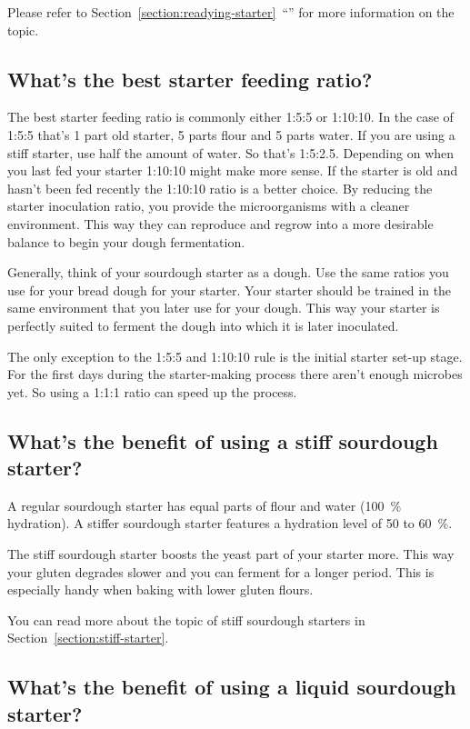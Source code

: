 Please refer to
Section~\ref{section:readying-starter}~``''
for more information on the topic.



\subsection{What's the best starter feeding ratio?}

The best starter feeding ratio is commonly either 1:5:5 or 1:10:10.
In the case of 1:5:5 that's 1 part old starter,
5 parts flour and 5 parts water. If you are using a stiff starter,
use half the amount of water. So that's 1:5:2.5. Depending on when
you last fed your starter 1:10:10 might make more sense. If the starter
is old and hasn't been fed recently the 1:10:10 ratio is a better choice.
By reducing the starter inoculation ratio, you provide the microorganisms
with a cleaner environment. This way they can reproduce and regrow
into a more desirable balance to begin your dough fermentation.

Generally, think of your sourdough starter as a dough. Use the same
ratios you use for your bread dough for your starter. Your starter
should be trained in the same environment that you later use
for your dough. This way your starter is perfectly suited to
ferment the dough into which it is later inoculated.

The only exception to the 1:5:5 and 1:10:10 rule is the initial
starter set-up stage. For the first days during the starter-making
process there aren't enough microbes yet. So using a 1:1:1 ratio
can speed up the process. 
\subsection{What's the benefit of using a stiff sourdough starter?}

A regular sourdough starter has equal parts of
flour and water (\qty{100}{\percent} hydration). A stiffer
sourdough starter features a hydration level of 50 to \qty{60}{\percent}.

The stiff sourdough starter boosts the yeast part
of your starter more. This way your gluten degrades
slower and you can ferment for a longer period. This
is especially handy when baking with lower gluten flours.

You can read more about the topic of stiff sourdough
starters in Section~\ref{section:stiff-starter}.

\subsection{What's the benefit of using a liquid sourdough starter?}

